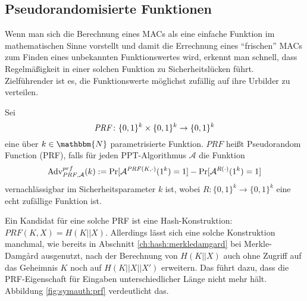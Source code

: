 \subsection{Pseudorandomisierte Funktionen}\label{ssec:prf} Wenn man
sich die Berechnung eines MACs als eine einfache Funktion im
mathematischen Sinne vorstellt und damit die Errechnung eines
"`frischen"' MACs zum Finden eines unbekannten Funktionswertes wird,
erkennt man schnell, dass Regelmäßigkeit in einer solchen Funktion zu
Sicherheitslücken führt. Zielführender ist es, die Funktionswerte
möglichst zufällig auf ihre Urbilder zu verteilen.
\begin{definition} Sei  \[\text{\textit{PRF}}\colon\{0,1\}^k \times \{0, 1\}^k \rightarrow
  \{0,1\}^k\] eine über $k \in \mathbbm{N}$ parametrisierte Funktion. $PRF$
  heißt Pseudorandom Function (PRF), falls für jeden PPT-Algorithmus
  $\mathcal{A}$ die Funktion
  \begin{equation*} \text{Adv}_{\text{\textit{PRF}},\mathcal{A}}^{prf}(k)
    := \Pr \lbrack \mathcal{A}^{\text{\textit{PRF}}(K,\cdot)}(1^k) = 1
    \rbrack - \Pr \lbrack \mathcal{A}^{R(\cdot)}(1^k) = 1 \rbrack
  \end{equation*} vernachlässigbar im Sicherheitsparameter $k$ ist, wobei $R: \{0,1\}^k \rightarrow
  \{0,1\}^k$ eine echt zufällige Funktion ist.~\\
\end{definition}

Ein Kandidat für eine solche PRF ist eine Hash-Konstruktion: $PRF(K,X) =
H(K||X)$. Allerdings lässt sich eine solche Konstruktion manchmal, wie
bereits in Abschnitt \ref{ch:hash:merkledamgard} bei Merkle-Damgård
ausgenutzt, nach der Berechnung von $H(K||X)$ auch ohne Zugriff auf das
Geheimnis $K$ noch auf $H(K||X||X')$ erweitern. Das führt dazu, dass die
PRF-Eigenschaft für Eingaben unterschiedlicher Länge nicht mehr
hält. Abbildung \ref{fig:symauth:prf} verdeutlicht das.

